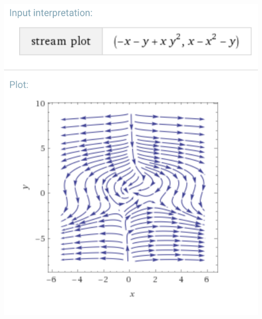 \documentclass[10pt,a4paper]{article}
\begin{document}
	\includegraphics[width=  \textwidth, keepaspectratio]{img/7c}
\end{document}
